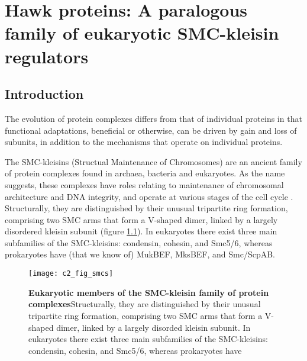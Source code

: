 \documentclass[a4paper,11pt,twoside,openright]{scrbook}
\begin{document}
\chapter{Hawk proteins: A paralogous family of eukaryotic SMC-kleisin regulators} \label{chapter:hawks}


\section{Introduction}
The evolution of protein complexes differs from that of individual proteins in that functional adaptations, beneficial or otherwise, can be driven by gain and loss of subunits, in addition to the mechanisms that operate on individual proteins.

The SMC-kleisins (Structual Maintenance of Chromosomes) are an ancient family of protein complexes found in archaea, bacteria and eukaryotes. As the name suggests, these complexes have roles relating to maintenance of chromosomal architecture and DNA integrity, and operate at various stages of the cell cycle \cite{Nasmyth2009, Hirano2016}. Structurally, they are distinguished by their unusual tripartite ring formation, comprising two SMC arms that form a V-shaped dimer, linked by a largely disordered kleisin subunit (figure \ref{figure:smcs}). In eukaryotes there exist three main subfamilies of the SMC-kleisins: condensin, cohesin, and Smc5/6, whereas prokaryotes have (that we know of) MukBEF, MksBEF, and Smc/ScpAB.

\begin{figure}[h]
\fcapsideright
    {\caption[Eukaryotic members of the SMC-kleisin family of protein complexes]{\sffamily\textbf{Eukaryotic members of the SMC-kleisin family of protein complexes}\newline \small Structurally, they are distinguished by their unusual tripartite ring formation, comprising two SMC arms that form a V-shaped dimer, linked by a largely disorded kleisin subunit. In eukaryotes there exist three main subfamilies of the SMC-kleisins: condensin, cohesin, and Smc5/6, whereas prokaryotes have }\label{figure:smcs}}
    {\texttt{[image: c2\_fig\_smcs]}}
\end{figure}
\end{document}
